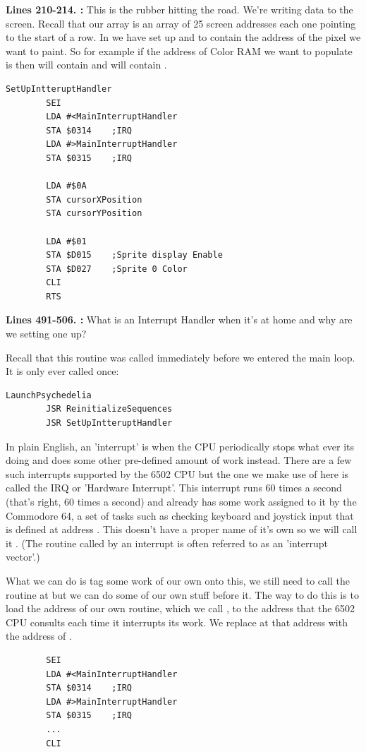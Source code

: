 \textbf{Lines 210-214. :} This is the rubber hitting the road. We're writing data to the
screen. Recall that our   array is an array of 25 screen addresses each one pointing
to the start of a row. In  we have set up  and  to contain the address of the pixel we want to paint. So for example if the address of Color RAM we want to populate
is  then  will contain  and  will
contain . 
\clearpage
\begin{lstlisting}[caption= Setting up our Interrupt Handler]
SetUpIntteruptHandler   
        SEI 
        LDA #<MainInterruptHandler
        STA $0314    ;IRQ
        LDA #>MainInterruptHandler
        STA $0315    ;IRQ

        LDA #$0A
        STA cursorXPosition
        STA cursorYPosition

        LDA #$01
        STA $D015    ;Sprite display Enable
        STA $D027    ;Sprite 0 Color
        CLI 
        RTS 
\end{lstlisting}
\clearpage
\textbf{Lines 491-506. :} What is an Interrupt Handler when it's at home and why are
we setting one up?

Recall that this routine was called immediately before we entered the main loop. It is only ever called once:
\begin{lstlisting}
LaunchPsychedelia   
        JSR ReinitializeSequences
        JSR SetUpIntteruptHandler
\end{lstlisting}

In plain English, an 'interrupt' is when the CPU periodically stops what ever its doing and does some other pre-defined amount
of work instead. There are a few such interrupts supported by the 6502 CPU but the one we make use of here is called the IRQ
or 'Hardware Interrupt'. This interrupt runs 60 times a second (that's right, 60 times a second) and already has some work
assigned to it by the Commodore 64, a set of tasks such as checking keyboard and joystick input that is defined at address .
This doesn't have a proper name of it's own so we will call it . (The routine called by an interrupt
is often referred to as an 'interrupt vector'.)

What we can do is tag some work of our own onto this, we still need to call the routine at  but we can do some of our
own stuff before it. The way to do this is to load the address of our own routine, which we call , to
the address that the 6502 CPU consults each time it interrupts its work. We replace  at that address with the address
of .  
\begin{lstlisting}
        SEI 
        LDA #<MainInterruptHandler
        STA $0314    ;IRQ
        LDA #>MainInterruptHandler
        STA $0315    ;IRQ
        ...
        CLI 
\end{lstlisting}

